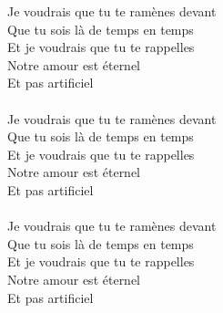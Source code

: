 Je voudrais que tu te ramènes devant\\
Que tu sois là de temps en temps\\
Et je voudrais que tu te rappelles\\
Notre amour est éternel\\
Et pas artificiel\\\\
Je voudrais que tu te ramènes devant\\
Que tu sois là de temps en temps\\
Et je voudrais que tu te rappelles\\
Notre amour est éternel\\
Et pas artificiel\\\\
Je voudrais que tu te ramènes devant\\
Que tu sois là de temps en temps\\
Et je voudrais que tu te rappelles\\
Notre amour est éternel\\
Et pas artificiel
